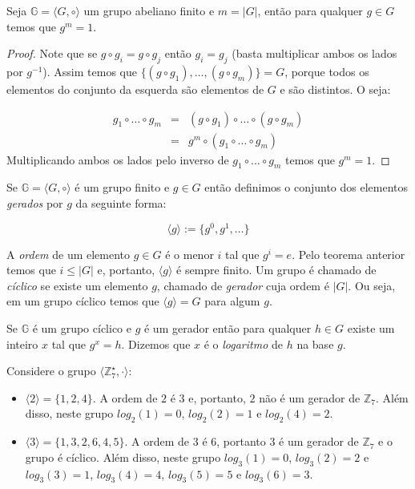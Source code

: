 \begin{theorem}
  Seja $\mathbb{G} = \langle G, \circ \rangle$ um grupo abeliano finito e $m = |G|$, então para qualquer $g \in G$ temos que $g^m = 1$.
\end{theorem}
\begin{proof}
  Note que se $g \circ g_i = g \circ g_j$ então $g_i = g_j$ (basta multiplicar ambos os lados por $g^{-1}$).
  Assim temos que $\{(g \circ g_1), \dots, (g \circ g_m)\} = G$, porque todos os elementos do conjunto da esquerda são elementos de $G$ e são distintos.
  O seja:
  
  \begin{eqnarray*}
    g_1 \circ \dots \circ g_m & = & (g \circ g_1) \circ \dots \circ (g \circ g_m)\\
                              & = & g^m \circ (g_1 \circ \dots \circ g_m)
  \end{eqnarray*}
  Multiplicando ambos os lados pelo inverso de $g_1 \circ \dots \circ g_m$ temos que $g^m = 1$.
\end{proof}

Se $\mathbb{G} = \langle G, \circ \rangle$ é um grupo finito e $g \in G$ então definimos o conjunto dos elementos {\em gerados} por $g$ da seguinte forma:

\begin{displaymath}
  \langle g \rangle := \{g^0, g^1, \dots \}
\end{displaymath}

A {\em ordem} de um elemento $g \in G$ é o menor $i$ tal que $g^i = e$.
Pelo teorema anterior temos que $i \leq |G|$ e, portanto, $\langle g \rangle$ é sempre finito.
Um grupo é chamado de {\em cíclico} se existe um elemento $g$, chamado de {\em gerador} cuja ordem é $|G|$.
Ou seja, em um grupo cíclico temos que $\langle g \rangle = G$ para algum $g$.

Se $\mathbb{G}$ é um grupo cíclico e $g$ é um gerador então para qualquer $h \in G$ existe um inteiro $x$ tal que $g^x = h$.
Dizemos que $x$ é o {\em logaritmo} de $h$ na base $g$.


\begin{example}
Considere o grupo $\langle \mathbb{Z}_7^\star, \cdot \rangle$:
\begin{itemize}
\item $\langle 2 \rangle = \{1, 2, 4\}$. A ordem de $2$ é $3$ e, portanto, $2$ não é um gerador de $\mathbb{Z}_7$. 
Além disso, neste grupo $log_2(1) = 0$, $log_2(2) = 1$ e $log_2(4) = 2$. 
\item $\langle 3 \rangle = \{1, 3, 2, 6, 4, 5\}$. A ordem de $3$ é $6$, portanto $3$ é um gerador de $\mathbb{Z}_7$ e o grupo é cíclico.
Além disso, neste grupo $log_3(1) = 0$, $log_3(2) = 2$ e $log_3(3) = 1$, $log_3(4)= 4$, $log_3(5) = 5$ e $log_3(6) = 3$. 
\end{itemize}
\end{example}


